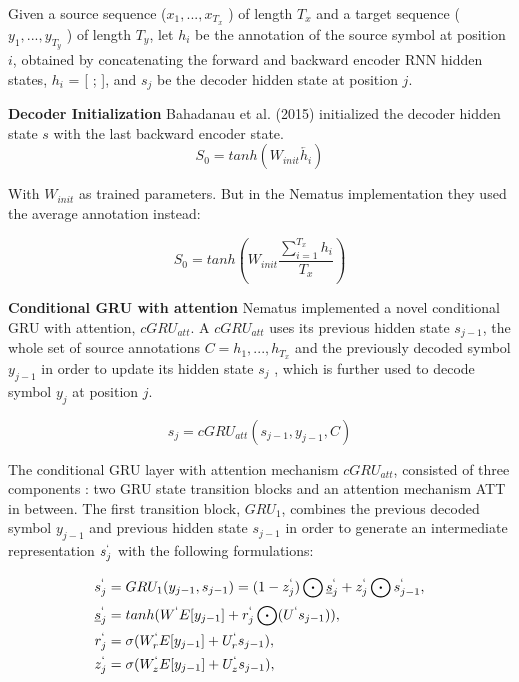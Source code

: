 Given a source sequence ($x_1, . . . , x_T_x$ ) of length $T_x$ and a target sequence ($y_1, . . . , y_T_y$ ) of length $T_y$, let $h_i$ be the annotation of the source symbol at position $i$, obtained by concatenating the forward and backward encoder RNN hidden states, $h_i$ = [ ;  ], and $s_j$ be the decoder hidden state at position $j$.

\textbf{Decoder Initialization} Bahadanau et al. (2015) initialized the decoder hidden state $s$ with the last backward encoder state.
\begin{equation}
S_0 = tanh (W_{init}\overleftarrow{h_i})
\end{equation}

With $W_{init}$ as trained parameters. But in the Nematus implementation they used the average annotation instead:

\begin{equation}
S_0 = tanh (W_{init} \frac{\sum_{i=1}^{T_x}h_i}{T_x})
\end{equation}

\textbf{Conditional GRU with attention} Nematus implemented a novel conditional GRU with attention, $cGRU_{att}$. A $cGRU_{att}$ uses its previous hidden state $s_{j-1}$, the whole set of source annotations $C = {h_1, . . . , h_{T_x}}$ and the previously decoded symbol $y_{j-1}$ in order to update its hidden state $s_j$ , which is further used to decode symbol $y_j$ at position $j$.

\begin{equation}
s_j= cGRU_{att}(s_{j-1},y_{j-1},C)
\end{equation}


The conditional GRU layer with attention mechanism $cGRU_{att}$, consisted of three components : two GRU state transition blocks and an attention mechanism ATT in between. The first transition block, $GRU_1$, combines the previous decoded symbol  $y_{j-1}$ and previous hidden state $s_{j-1}$ in order to generate an intermediate representation $s_j^`$ with the following formulations:


\begin{align*}
s_j^` &= GRU_1(y_{j-1},s_{j-1})=(1-z_j^`)\bigodot \underline{s}_j^`+z_j^`\bigodot s_{j-1}^`,\\
\underline{s}_j^`&= tanh(W^`E[y_{j-1}]+r_j^`\bigodot(U^`s_{j-1})),\\
{r}_j^`&= \sigma (W_r^`E[y_{j-1}]+U_r^`s_{j-1}),\\
{z}_j^`&= \sigma (W_z^`E[y_{j-1}]+U_z^`s_{j-1}),
\end{align*}

